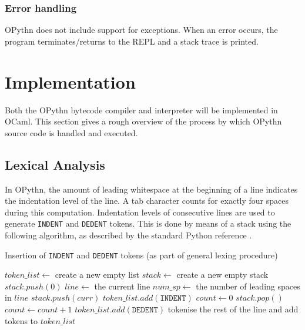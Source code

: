 \documentclass[11pt, twoside]{article}
\newcommand{\ms}{\texttt}
\begin{document}
    \subsubsection{Error handling}
    OPythn does not include support for exceptions. When an error occurs, the program terminates/returns to the REPL and a stack trace is printed.


\section{Implementation}
Both the OPythn bytecode compiler and interpreter will be implemented in OCaml. This section gives a rough overview of the process by which OPythn source code is handled and executed.
    \subsection{Lexical Analysis}
    \indent In OPythn, the amount of leading whitespace at the beginning of a line indicates the indentation level of the line. A tab character counts for exactly four spaces during this computation. Indentation levels of consecutive lines are used to generate \ms{INDENT} and \ms{DEDENT} tokens. This is done by means of a stack using the following algorithm, as described by the standard Python reference \cite{pythonref}.
    \begin{algorithm}
    \caption{Insertion of \ms{INDENT} and \ms{DEDENT} tokens (as part of general lexing procedure)}
    \begin{algorithmic}[1]
        \State $token\_list \gets$ create a new empty list
        \State $stack \gets$ create a new empty stack
        \State $stack.push(0)$
            \State $line \gets$ the current line
            \State $num\_sp \gets$ the number of leading spaces in $line$
                $stack.push(curr)$
                $token\_list.add(\ms{INDENT})$
                \State $count\gets 0$
                    \State $stack.pop()$
                    \State $count\gets count + 1$
                \EndWhile
                    \State $token\_list.add(\ms{DEDENT})$
                \EndFor
                \EndIf
                \State tokenise the rest of the line and add tokens to $token\_list$
    \end{algorithmic}
    \end{algorithm}
\end{document}
